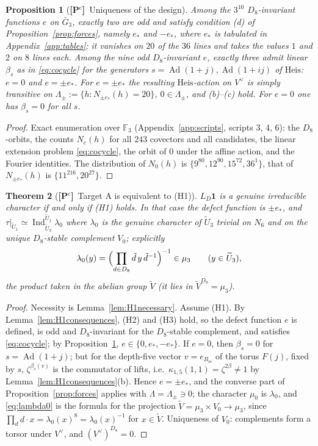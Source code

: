 \documentclass[11pt]{article}
\newcommand{\Fq}{\mathbb F}
\newcommand{\Ind}{\operatorname{Ind}}
\newcommand{\Ad}{\operatorname{Ad}}
\newcommand{\tU}{\widetilde U}
\newcommand{\tV}{\widetilde V}
\newcommand{\Heis}{\mathrm{Heis}}
\newcommand{\Pctag}{\textnormal{\textbf{[P$^{\mathrm c}$]}}}
\theoremstyle{plain}
\newtheorem{theorem}{Theorem}[section]
\newtheorem{proposition}[theorem]{Proposition}
\theoremstyle{definition}
\begin{document}
\begin{proposition}[\Pctag\ Uniqueness of the design]\label{prop:design}
Among the $3^{10}$ $D_8$-invariant functions $e$ on $\bar G_3$,
exactly two are odd and satisfy condition (d) of
Proposition~\ref{prop:forces}, namely $e_*$ and $-e_*$, where $e_*$ is
tabulated in Appendix~\ref{app:tables}; it vanishes on $20$ of the $36$
lines and takes the values $1$ and $2$ on $8$ lines each.  Among the
nine odd $D_8$-invariant $e$, exactly three admit linear
$\beta_s$ as in \eqref{eq:cocycle} for the generators
$s=\Ad(1+j),\Ad(1+ij)$ of $\Heis$: $e=0$ and $e=\pm e_*$.  For
$e=\pm e_*$ the resulting $\Heis$-action on $V^\vee$ is simply
transitive on $\Lambda_{\pm}:=\{h:N_{\pm e_*}(h)=20\}$, $0\in\Lambda_\pm$,
and (b)--(c) hold.  For $e=0$ one has $\beta_s=0$ for all $s$.
\end{proposition}
\begin{proof}
Exact enumeration over $\Fq_3$ (Appendix~\ref{app:scripts}, scripts
3, 4, 6): the $D_8$-orbits, the counts $N_e(h)$ for all $243$ covectors
and all candidates, the linear extension problem \eqref{eq:cocycle},
the orbit of $0$ under the affine action, and the Fourier identities.
The distribution of $N_0(h)$ is $\{9^{80},12^{90},15^{72},36^{1}\}$,
that of $N_{\pm e_*}(h)$ is $\{11^{216},20^{27}\}$.
\end{proof}

\begin{theorem}[\Pctag\ Target A is equivalent to (H1)]\label{thm:H1equiv}
$L_D\mathbf1$ is a genuine irreducible character if and only if (H1)
holds.  In that case the defect function is $\pm e_*$, and
$\tau|_{\tU_1}\simeq\Ind_{\tU_3}^{\tU_1}\lambda_0$ where $\lambda_0$ is the
genuine character of $\tU_3$ trivial on $N_6$ and on the unique
$D_8$-stable complement $V_0$; explicitly
\begin{equation}\label{eq:lambda0}
 \lambda_0(y)=\Bigl(\prod_{d\in D_8}\tilde d\,y\,\tilde d^{-1}\Bigr)^{-1}
 \in\mu_3\qquad(y\in\tU_3),
\end{equation}
the product taken in the abelian group $\tV$ (it lies in $\tV^{D_8}=\mu_3$).
\end{theorem}
\begin{proof}
Necessity is Lemma~\ref{lem:H1necessary}.  Assume (H1).  By
Lemma~\ref{lem:H1consequences}, (H2) and (H3) hold, so the defect
function $e$ is defined, is odd and $D_8$-invariant for the
$D_8$-stable complement, and satisfies \eqref{eq:cocycle}; by
Proposition~\ref{prop:design}, $e\in\{0,e_*,-e_*\}$.  If $e=0$, then
$\beta_s=0$ for $s=\Ad(1+j)$; but for the depth-five vector
$v=e_{B_{\mathrm{re}}}$ of the torus $F(j)$, fixed by $s$,
$\zeta^{\beta_s(v)}$ is the commutator of lifts, i.e.\
$\kappa_{1,5}(1,1)=\zeta^{2\beta}\ne1$ by Lemma~\ref{lem:H1consequences}(b).
Hence $e=\pm e_*$, and the converse part of Proposition~\ref{prop:forces}
applies with $\Lambda=\Lambda_\pm\ni0$; the character $\mu_0$ is
$\lambda_0$, and \eqref{eq:lambda0} is the formula for the projection
$\tV=\mu_3\times V_0\to\mu_3$, since $\prod_{d}d\cdot x=\lambda_0(x)^8=\lambda_0(x)^{-1}$
for $x\in\tV$.  Uniqueness of $V_0$: complements form a torsor under
$V^\vee$, and $(V^\vee)^{D_8}=0$.
\end{proof}
\end{document}

